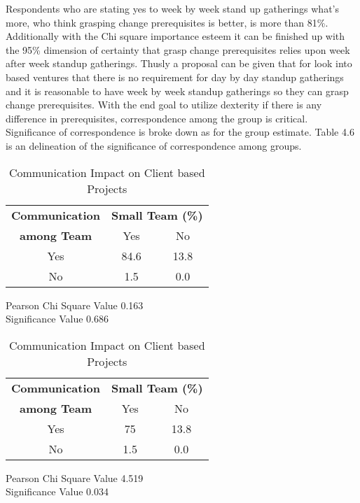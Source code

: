 Respondents who are stating yes to week by week stand up gatherings what's more, who think grasping change prerequisites is better, is more than 81\%. Additionally with the Chi square importance esteem it can be finished up with the 95\% dimension of certainty that grasp change prerequisites relies upon week after week standup gatherings. Thusly a proposal can be given that for look into based ventures that there is no requirement for day by day standup gatherings and it is reasonable to have week by week standup gatherings so they can grasp change prerequisites. With the end goal to utilize dexterity if there is any difference in prerequisites, correspondence among the group is critical. Significance of correspondence is broke down as for the group estimate. Table 4.6 is an delineation of the significance of correspondence among groups.


\begin{table}[htbp]
	\caption{Communication Impact on Research based Projects}
	\begin{center}
		\renewcommand\arraystretch{2}
		\begin{tabular}{|c|c|c|}
			\hline
			\textbf{Communication} & \multicolumn{2}{c|}{\textbf{Small Team (\%)}}
			\\ \cline{2-3}
			\textbf{among Team} & Yes & No 
			\\ \hline
			Yes & 84.6 & 13.8
			\\ \hline
			No & 1.5 & 0.0
			\\ \hline
		\end{tabular}
	\end{center}
	Pearson Chi Square Value 0.163
	\\ Significance Value 0.686
	\caption{Communication Impact on Client based Projects}
	\begin{center}
		\renewcommand\arraystretch{2}
		\begin{tabular}{|c|c|c|}
			\hline
			\textbf{Communication} & \multicolumn{2}{c|}{\textbf{Small Team (\%)}}
			\\ \cline{2-3}
			\textbf{among Team} & Yes & No 
			\\ \hline
			Yes & 75 & 13.8
			\\ \hline
			No & 1.5 & 0.0
			\\ \hline
		\end{tabular}
	\end{center}
	Pearson Chi Square Value 4.519
	\\ Significance Value 0.034
	\label{table:communication}
\end{table}

